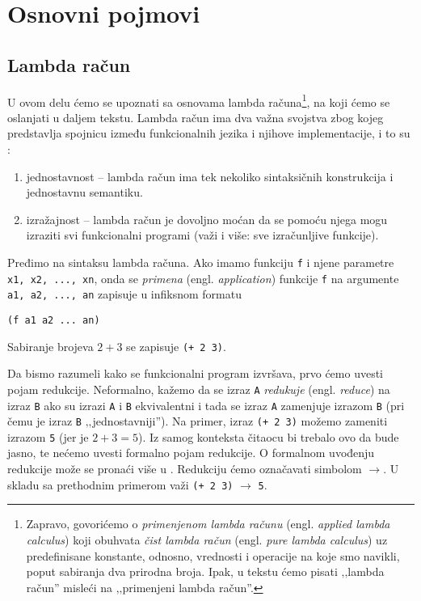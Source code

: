 \section{Osnovni pojmovi}
\label{sec:osnovni pojmovi}

\subsection{Lambda račun}
\label{subsec:lambda racun}

U ovom delu ćemo se upoznati sa osnovama lambda računa\footnote{Zapravo, govorićemo o \textit{primenjenom lambda računu} (engl. \textit{applied lambda calculus}) koji obuhvata \textit{čist lambda račun} (engl. \textit{pure lambda calculus}) uz predefinisane konstante, odnosno, vrednosti i operacije na koje smo navikli, poput sabiranja dva prirodna broja. Ipak, u tekstu ćemo pisati ‚‚lambda račun'' misleći na ‚‚primenjeni lambda račun''.}, na koji ćemo se oslanjati u daljem tekstu. Lambda račun ima dva važna svojstva zbog kojeg predstavlja spojnicu između funkcionalnih jezika i njihove implementacije, i to su \cite{the-implementation-of-functional-programming-languages}:
\begin{enumerate}
	\item jednostavnost -- lambda račun ima tek nekoliko sintaksičnih konstrukcija i jednostavnu semantiku.
	\item izražajnost -- lambda račun je dovoljno moćan da se pomoću njega mogu izraziti svi funkcionalni programi (važi i više: sve izračunljive funkcije).
\end{enumerate}

Pređimo na sintaksu lambda računa. Ako imamo funkciju \verb|f| i njene parametre \verb|x1, x2, ..., xn|, onda se \textit{primena} (engl. \textit{application}) funkcije \verb|f| na argumente \verb|a1, a2, ..., an| zapisuje u infiksnom formatu
\begin{center}
	\verb|(f a1 a2 ... an)|
\end{center}

\begin{primer}
	Sabiranje brojeva $2+3$ se zapisuje \verb|(+ 2 3)|.
\end{primer}

Da bismo razumeli kako se funkcionalni program izvršava, prvo ćemo uvesti pojam redukcije. Neformalno, kažemo da se izraz \verb|A| \textit{redukuje} (engl. \textit{reduce}) na izraz \verb|B| ako su izrazi \verb|A| i \verb|B| ekvivalentni i tada se izraz \verb|A| zamenjuje izrazom \verb|B| (pri čemu je izraz \verb|B| ‚‚jednostavniji''). Na primer, izraz \verb|(+ 2 3)| možemo zameniti izrazom \verb|5| (jer je $2+3=5$). Iz samog konteksta čitaocu bi trebalo ovo da bude jasno, te nećemo uvesti formalno pojam redukcije. O formalnom uvođenju redukcije može se pronaći više u \cite{foundations-of-functional-programming}. Redukciju ćemo označavati simbolom $\rightarrow$. U skladu sa prethodnim primerom važi \verb|(+ 2 3)| $\rightarrow$ \verb|5|.

